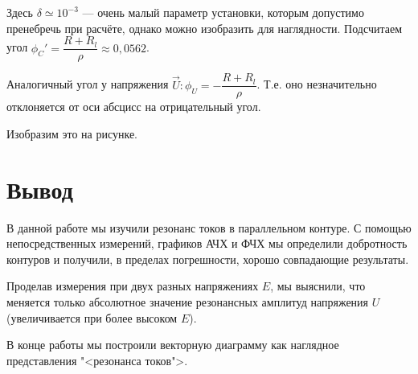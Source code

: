 \documentclass[12pt]{kiarticle}
\begin{document}
Здесь $ \delta \simeq 10^{-3}$ --- очень малый параметр установки, которым допустимо пренебречь при расчёте, однако можно изобразить для наглядности. Подсчитаем угол $ \phi_C' =   \dfrac{R + R_l}{\rho} \approx 0,0562 $. 

Аналогичный угол у напряжения $ \vec{U}: \phi_U = - \dfrac{R + R_l}{\rho} $. Т.е. оно незначительно отклоняется от оси абсцисс на отрицательный угол.

Изобразим это на рисунке. 

\section{Вывод}

В данной работе мы изучили резонанс токов в параллельном контуре. С помощью непосредственных измерений, графиков АЧХ и ФЧХ мы определили добротность контуров и получили, в пределах погрешности, хорошо совпадающие результаты. 

Проделав измерения при двух разных напряжениях $ E $, мы выяснили, что меняется только абсолютное значение резонансных амплитуд напряжения $ U $ (увеличивается при более высоком $ E $). 

В конце работы мы построили векторную диаграмму как наглядное представления "<резонанса токов">. 
\end{document}
